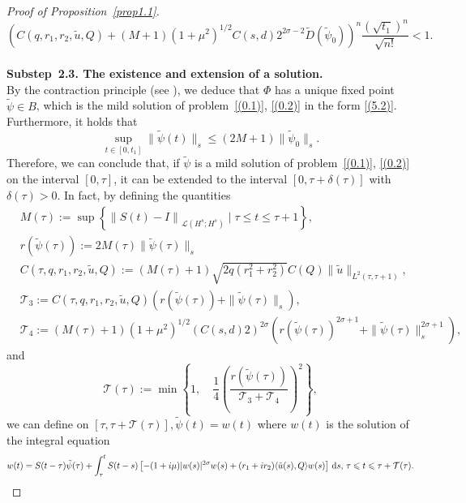\documentclass[review]{elsarticle}
\theoremstyle{dotless}
\def\d{{\,\rm d}}
\def \leq{\leqslant}
\numberwithin{equation}{section}
\begin{document}
\begin{proof}[Proof of Proposition~\ref{prop1.1}]
\begin{equation*}
		\left(C(q,r_1,r_2, \tilde{u}, Q)+(M+1)(1+\mu^2)^{1/2}C\left(s,d\right) 2^{2\sigma-2}\tilde{D} (\tilde{\psi}_0 )\right)^n \frac{\left(\sqrt{t_1}\right)^n}{\sqrt{n!}}<1.
	\end{equation*}
	\\
	\textbf{Substep~2.3. The existence and extension of a solution.}
	\\
	By the contraction principle (see \cite[Theorem~5.7]{Brezis}), we deduce that $ \Phi $ has a unique fixed point $ \tilde{\psi}\in B $, which is the mild solution of problem~\eqref{(0.1)}, \eqref{(0.2)} in the form \eqref{(5.2)}.
	Furthermore, it holds that
	\begin{equation*}
		\sup _{t \in [0, t_1 ]}\|\tilde{\psi}(t)\|_{s} \leq(2 M+1) \|\tilde{\psi}_0 \|_{s}.
	\end{equation*}
	Therefore, we can conclude that, if $\tilde{\psi}$ is a mild solution of problem~\eqref{(0.1)}, \eqref{(0.2)} on the interval $[0, \tau]$, it can be extended to the interval $[0, \tau+\delta(\tau)]$ with $ \delta(\tau)>0 $. 
	In fact, by defining the quantities
	\begin{equation*}
		\begin{aligned}
			&M(\tau):=\sup \left\{\left\|S(t)-I\right\|_{\mathcal{L}\left(H^s; H^s\right)}\mid \tau \leq t \leq \tau+1\right\}, \\ &r (\tilde{\psi}(\tau)):=2 M(\tau) \|\tilde{\psi}(\tau) \|_{s} \\
			&C(\tau,q,r_1,r_2, \tilde{u}, Q):=(M(\tau)+1) \sqrt{2q( r_1^2+r_2^2)}  C(Q) \|\tilde{u}\|_{L^2(\tau,\tau+1)},\\
			&\mathcal{T}_3:= C(\tau,q,r_1,r_2, \tilde{u}, Q)\left(r (\tilde{\psi}(\tau) )+ \|\tilde{\psi}(\tau) \|_{s}\right),\\
			&	\mathcal{T}_4:=(M(\tau)+1)(1+\mu^2)^{1/2}\left(C\left(s,d\right) 2\right)^{2\sigma}\left(r(\tilde{\psi}(\tau))^{2\sigma+1} + \|\tilde{\psi}(\tau)\|_s^{2\sigma+1} \right),
		\end{aligned}
	\end{equation*}
	and 
	\begin{equation*}
		\mathcal{T}(\tau):=\min\left\{1,\quad\frac14\left(\frac{r (\tilde{\psi}(\tau) )}{\mathcal{T}_3+\mathcal{T}_4}\right)^2\right\},
	\end{equation*}
	we can define on $[\tau, \tau+\mathcal{T}(\tau)], \tilde{\psi}(t)=w(t)$ where $w(t)$ is the solution of the integral equation
	\begin{equation*}
		w(t)=S(t-\tau) \tilde{\psi}(\tau)+\int_\tau^t S(t-s) \left[-(1+i \mu)|w(s)|^{2 \sigma} w(s) +(r_1+ir_2)\langle \tilde{u}(s),Q\rangle w(s)\right] \d s,\,  \tau \leq t \leq \tau+\mathcal{T}(\tau).
	\end{equation*}
	

\end{proof}
\end{document}
